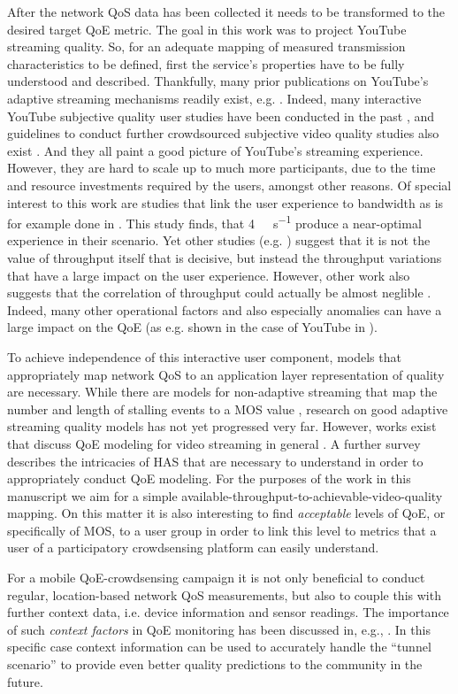 After the network \gls{QoS} data has been collected it needs to be transformed to the desired target \gls{QoE} metric. The goal in this work was to project YouTube streaming quality. So, for an adequate mapping of measured transmission characteristics to be defined, first the service's properties have to be fully understood and described. Thankfully, many prior publications on YouTube's adaptive streaming mechanisms readily exist, e.g. \cite{7810251,7497231}. Indeed, many interactive YouTube subjective quality user studies have been conducted in the past \cite{7194076,Nam:2014:YPA:2619239.2631433}, and guidelines to conduct further crowdsourced subjective video quality studies also exist \cite{7148150}. And they all paint a good picture of YouTube's streaming experience. However, they are hard to scale up to much more participants, due to the time and resource investments required by the users, amongst other reasons. Of special interest to this work are studies that link the user experience to bandwidth as is for example done in \cite{Casas:2015:EQC:2785971.2785978}. This study finds, that \SI{4}{\mega\bit\per\second} produce a near-optimal experience in their scenario. Yet other studies (e.g. \cite{7247426}) suggest that it is not the value of throughput itself that is decisive, but instead the throughput variations that have a large impact on the user experience. However, other work also suggests that the correlation of throughput could actually be almost neglible \cite{7562672}. Indeed, many other operational factors and also especially anomalies can have a large impact on the \gls{QoE} (as e.g. shown in the case of YouTube in \cite{6975242}).

To achieve independence of this interactive user component, models that appropriately map network \gls{QoS} to an application layer representation of quality are necessary. While there are models for non-adaptive streaming that map the number and length of stalling events to a \gls{MOS} value \cite{Hossfeld2013}, research on good adaptive streaming quality models has not yet progressed very far. However, works exist that discuss \gls{QoE} modeling for video streaming in general \cite{7148138}. A further survey \cite{6913491} describes the intricacies of \gls{HAS} that are necessary to understand in order to appropriately conduct \gls{QoE} modeling. For the purposes of the work in this manuscript we aim for a simple available-throughput-to-achievable-video-quality mapping. On this matter it is also interesting to find \textit{acceptable} levels of \gls{QoE}, or specifically of \gls{MOS}, to a user group in order to link this level to metrics that a user of a participatory crowdsensing platform can easily understand.

For a mobile \gls{QoE}-crowdsensing campaign it is not only beneficial to conduct regular, location-based network \gls{QoS} measurements, but also to couple this with further context data, i.e. device information and sensor readings. The importance of such \textit{context factors} in \gls{QoE} monitoring has been discussed in, e.g., \cite{7140480}. In this specific case context information can be used to accurately handle the ``tunnel scenario'' \cite{7511206,Metzger2016246} to provide even better quality predictions to the community in the future.